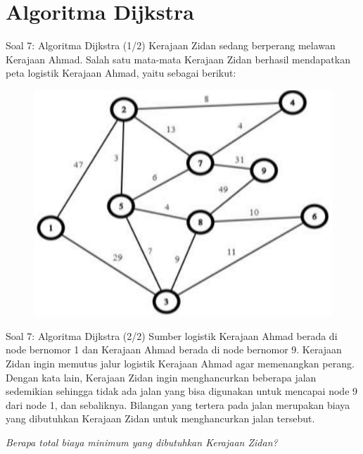 \documentclass[english,t]{beamer}
\begin{document}
\section{Algoritma Dijkstra}
\begin{frame}{Soal 7: Algoritma Dijkstra (1/2)} 
Kerajaan Zidan sedang berperang melawan Kerajaan Ahmad. Salah satu mata-mata Kerajaan Zidan berhasil mendapatkan peta logistik Kerajaan Ahmad, yaitu sebagai berikut:
\begin{figure}[!ht]
	\centering
	\includegraphics[scale=.225]{images/soal-7-peta}
\end{figure}
\end{frame}

\begin{frame}{Soal 7: Algoritma Dijkstra (2/2)} 
Sumber logistik Kerajaan Ahmad berada di node bernomor 1 dan Kerajaan Ahmad berada di node bernomor 9. Kerajaan Zidan ingin memutus jalur logistik Kerajaan Ahmad agar memenangkan perang. Dengan kata lain, Kerajaan Zidan ingin menghancurkan beberapa jalan sedemikian sehingga tidak ada jalan yang bisa digunakan untuk mencapai node 9 dari node 1, dan sebaliknya. Bilangan yang tertera pada jalan merupakan biaya yang dibutuhkan Kerajaan Zidan untuk menghancurkan jalan tersebut. 

\bigskip
\textit{Berapa total biaya minimum yang dibutuhkan Kerajaan Zidan?}
\end{frame}
\end{document}

